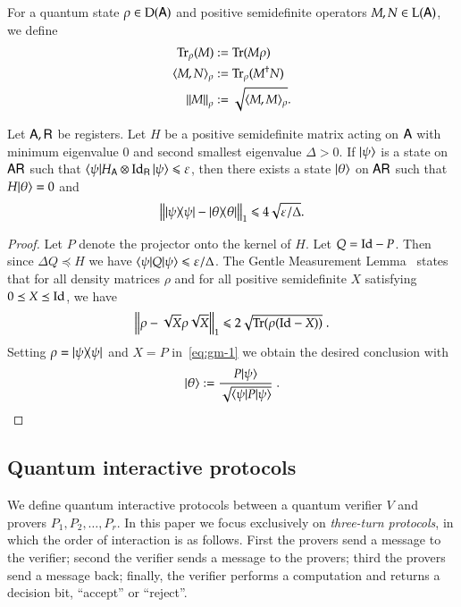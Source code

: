 For a quantum state $\rho \in \mathrm{D}({\mathsf{A}})$ and positive semidefinite operators $M,N \in \mathrm{L}({\mathsf{A}})$, we define 
\begin{align}
	\operatorname{Tr}_\rho(M) &:= \operatorname{Tr}(M \rho) \\
	\langle M, N \rangle_\rho &:= \operatorname{Tr}_\rho (M^\dagger N) \\
	\left\lVert M \right\rVert_\rho & := \sqrt{ \langle M, M \rangle_\rho}.
\end{align}

\begin{lemma}
\label{lem:closeness_to_groundspace}
	Let ${\mathsf{A}}, {\mathsf{R}}$ be registers. Let $H$ be a positive semidefinite matrix acting on ${\mathsf{A}}$ with minimum eigenvalue $0$ and second smallest eigenvalue $\Delta > 0$. If $|\psi\rangle$ is a state on ${\mathsf{A}} {\mathsf{R}}$ such that $\langle\psi| H_{{\mathsf{A}}} \otimes \mathop{\mathrm{Id}}\!\mathinner{}_{{\mathsf{R}}} |\psi\rangle \leqslant \varepsilon$, then there exists a state $|\theta\rangle$ on ${\mathsf{A}} {\mathsf{R}}$ such that $H |\theta\rangle = 0$ and
	\[
		\left \| |\psi\rangle\! \langle \psi| - |\theta\rangle\! \langle \theta| \right \|_1 \leqslant 4\sqrt{\varepsilon/\Delta}.
	\]
\end{lemma}
\begin{proof}
	Let $P$ denote the projector onto the kernel of $H$. Let $Q = \mathop{\mathrm{Id}}\!\mathinner{} - P$. Then since $\Delta Q \preceq H$ we have $\langle\psi| Q |\psi\rangle \leqslant \varepsilon/\Delta$. The Gentle Measurement Lemma~\cite{ogawa2002new} states that for all density matrices $\rho$ and for all positive semidefinite $X$ satisfying $0 \preceq X \preceq \mathop{\mathrm{Id}}\!\mathinner{}$, we have
	\begin{equation}\label{eq:gm-1}
		\left \| \rho - \sqrt{X}\rho \sqrt{X}  \right \|_1 \leq 2 \sqrt{ \Tr(\rho (\Id - X))}\;.
	\end{equation}
	Setting $\rho = |\psi\rangle\! \langle \psi|$ and $X = P$ in~\eqref{eq:gm-1} we obtain the desired conclusion with
	\[
		|\theta\rangle := \frac{ P |\psi\rangle}{\sqrt{ \langle\psi| P |\psi\rangle}}\;.
	\]
\end{proof}

\subsection{Quantum interactive protocols} 

We define quantum interactive protocols between a quantum verifier $V$ and provers $P_1,P_2,\ldots,P_r$. In this paper we focus exclusively on \emph{three-turn protocols}, in which the order of interaction is as follows. First the provers send a message to the verifier; second the verifier sends a message to the provers; third the provers send a message back; finally, the verifier performs a computation and returns a decision bit,  ``accept'' or ``reject''. 

